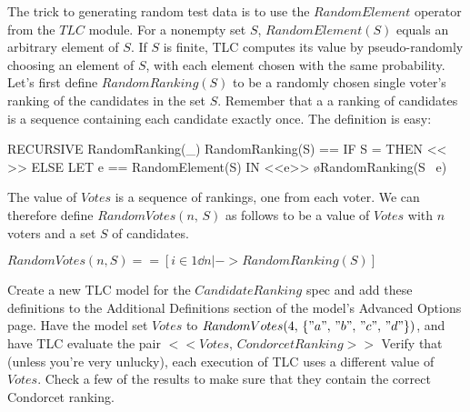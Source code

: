 \documentclass[fleqn,leqno]{article}
\begin{document}
The trick to generating random test data is to use the 
$RandomElement$
operator from the $TLC$ module.  For a nonempty set $S$,
$RandomElement(S)$ equals an arbitrary element of $S$.  If $S$ is
finite, TLC computes its value by pseudo-randomly choosing an element
of $S$, with each element chosen with the same probability.  Let's
first define $RandomRanking(S)$ to be a randomly chosen single voter's
ranking of the candidates in the set $S$.  Remember that a a ranking
of candidates is a sequence containing each candidate exactly once.
The definition is easy:
\begin{display}
\begin{notla}
RECURSIVE RandomRanking(_)
RandomRanking(S) == IF S = {} THEN << >>
                              ELSE LET e == RandomElement(S)
                                   IN <<e>> \o RandomRanking(S \ {e})
\end{notla}
\begin{tlatex}
%
%
\end{tlatex}
\end{display}
The value of $Votes$ is a sequence of rankings, one from each voter.
We can therefore define $RandomVotes(n,\,S)$ as follows to be a value
of $Votes$ with $n$ voters and a set $S$ of candidates.
\begin{display}
 $RandomVotes(n, S) == [i \in 1\dd n |-> RandomRanking(S)]$%
\end{display}
Create a new TLC model for the $CandidateRanking$ spec and add these
definitions to the \textsf{Additional Definitions} section of the
model's \textsf{Advanced Options} page.  Have the model set $Votes$
to $RandomVotes(4,\, \{"a",\,"b",\,"c",\,"d"\})$, and have TLC
evaluate the pair
  $<<Votes,\,CondorcetRanking>>$
Verify that (unless you're very unlucky), each execution of TLC uses
a different value of $Votes$.  Check a few of the results to make
sure that they contain the correct Condorcet ranking.
\end{document}
